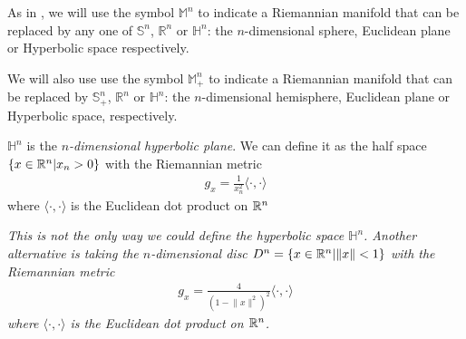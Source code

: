 As in \cite{italiani}, we will use the symbol $\mathbb{M}^n$ to indicate a Riemannian manifold that can be replaced by any one of  $\mathbb{S}^n$, $\mathbb{R}^n$ or $\mathbb{H}^n$: the $n$-dimensional sphere, Euclidean plane or Hyperbolic space respectively. 

We will also use use the symbol $\mathbb{M}^n_+$ to indicate a Riemannian manifold that can be replaced by $\mathbb{S}^n_+$, $\mathbb{R}^n$ or $\mathbb{H}^n$: the $n$-dimensional hemisphere, Euclidean plane or Hyperbolic space, respectively.


\begin{defin}
	$\mathbb{H}^n$ is the {\em $n$-dimensional hyperbolic plane}. We can define it as the half space $\{x\in \mathbb{R}^n|x_n > 0\}$ with the Riemannian metric
	\begin{align*}
		g_x=\frac{1}{x_n^2} \langle\cdot, \cdot \rangle
	\end{align*}
	where $\langle\cdot, \cdot \rangle$ is the Euclidean dot product on $\mathbb{R}^n$
\end{defin}


\begin{oss}
	\em This is not the only way we could define the hyperbolic space $\mathbb{H}^n$. Another alternative is taking the $n$-dimensional disc $D^n = \{x\in \mathbb{R}^n|\lVert x \rVert  < 1 \}$ with the Riemannian metric 
	\begin{align*}
		g_x=\frac{4}{(1-\lVert x \rVert^2)^2} \langle\cdot, \cdot \rangle
	\end{align*}
	where $\langle\cdot, \cdot \rangle$ is the Euclidean dot product on $\mathbb{R}^n$.
\end{oss}

